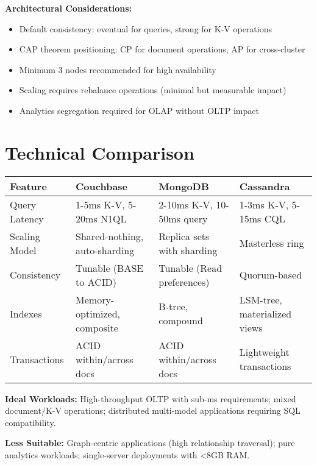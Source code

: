 \textbf{Architectural Considerations:}
\begin{itemize}
  \item Default consistency: eventual for queries, strong for K-V operations
  \item CAP theorem positioning: CP for document operations, AP for cross-cluster
  \item Minimum 3 nodes recommended for high availability
  \item Scaling requires rebalance operations (minimal but measurable impact)
  \item Analytics segregation required for OLAP without OLTP impact
\end{itemize}

\section{Technical Comparison}

\begin{tabular}{|p{3.0cm}|p{3.5cm}|p{3.5cm}|p{3.5cm}|}
\hline
\textbf{Feature} & \textbf{Couchbase} & \textbf{MongoDB} & \textbf{Cassandra} \\
\hline
Query Latency & 1-5ms K-V, 5-20ms N1QL & 2-10ms K-V, 10-50ms query & 1-3ms K-V, 5-15ms CQL \\
\hline
Scaling Model & Shared-nothing, auto-sharding & Replica sets with sharding & Masterless ring \\
\hline
Consistency & Tunable (BASE to ACID) & Tunable (Read preferences) & Quorum-based \\
\hline
Indexes & Memory-optimized, composite & B-tree, compound & LSM-tree, materialized views \\
\hline
Transactions & ACID within/across docs & ACID within/across docs & Lightweight transactions \\
\hline
\end{tabular}

\textbf{Ideal Workloads:} High-throughput OLTP with sub-ms requirements; mixed document/K-V operations; distributed multi-model applications requiring SQL compatibility.

\textbf{Less Suitable:} Graph-centric applications (high relationship traversal); pure analytics workloads; single-server deployments with <8GB RAM.
